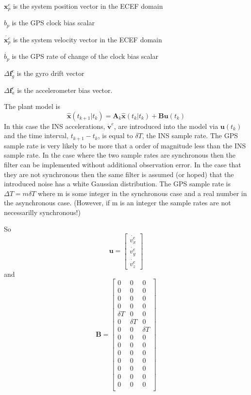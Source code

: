 \documentclass[a4paper]{report}
\numberwithin{equation}{chapter}
\newcommand{\mat}[1]{\boldsymbol{#1}}
\begin{document}
$\mat{x}^e_p$ is the system position vector in the ECEF domain

$b_p$ is the GPS clock bias scalar

$\dot{\mat{x}^e_p}$ is the system velocity vector in the ECEF domain

$\dot{b_p}$ is the GPS rate of change of the clock bias scalar

$\Delta \mat{f}^e_g$ is the gyro drift vector

$\Delta \mat{f}^e_a$ is the accelerometer bias vector.

\bigskip

The plant model is
\begin{equation}
\hat{\mat{x}} \left( t_{k + 1} | t_k \right) = \mat{A}_k \hat{\mat{x}} \left( t_k | t_k \right) + \mat{B} \mat{u} \left( t_k \right)
\label{eqn:PlantModel}
\end{equation}
In this case the INS accelerations, $\dot{\mat{v}}^e$, are introduced into the model via $\mat{u} \left( t_k \right)$ and the time interval, $t_{k + 1} - t_k$, is equal to $\delta T$, the INS sample rate. The GPS sample rate is very likely to be more that a order of magnitude less than the INS sample rate. In the case where the two sample rates are synchronous then the filter can be implemented without additional observation error. In the case that they are not synchronous then the same filter is assumed (or hoped) that the introduced noise has a white Gaussian distribution. The GPS sample rate is $\Delta T = m \delta T$ where m is some integer in the synchronous case and a real number in the asynchronous case. (However, if m is an integer the sample rates are not necessarilly synchronous!)

\bigskip

So
\begin{equation}
\mat{u} =
\begin{bmatrix}
\dot{v^e_x}\\
\dot{v^e_y}\\
\dot{v^e_z}
\end{bmatrix}
\end{equation}
and
\begin{equation}
\mat{B} =
\begin{bmatrix}
0 & 0 & 0\\
0 & 0 & 0\\
0 & 0 & 0\\
0 & 0 & 0\\
\delta T & 0 & 0\\
0 & \delta T & 0\\
0 & 0 & \delta T\\
0 & 0 & 0\\
0 & 0 & 0\\
0 & 0 & 0\\
0 & 0 & 0\\
0 & 0 & 0\\
0 & 0 & 0\\
0 & 0 & 0\\
\end{bmatrix}
\end{equation}
\end{document}
